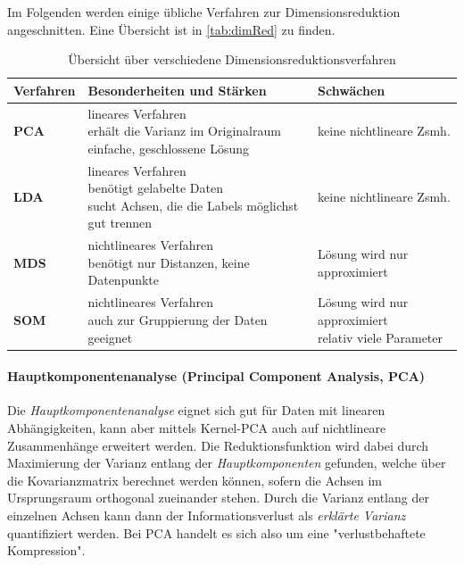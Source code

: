 				Im Folgenden werden einige übliche Verfahren zur Dimensionsreduktion angeschnitten. Eine Übersicht ist in \autoref{tab:dimRed} zu finden.

				\begin{table}
					\centering
					\begin{tabular}{l|ll}
						\toprule
						\textbf{Verfahren} & \textbf{Besonderheiten und Stärken} & \textbf{Schwächen} \\ \midrule
						\textbf{PCA} & \multirowcell{3}[][l]{lineares Verfahren\\erhält die Varianz im Originalraum\\einfache, geschlossene Lösung} & keine nichtlineare Zsmh. \\ \midrule
						\textbf{LDA} & \multirowcell{3}[][l]{lineares Verfahren\\benötigt gelabelte Daten\\sucht Achsen, die die Labels möglichst gut trennen} & keine nichtlineare Zsmh. \\ \midrule
						\textbf{MDS} & \multirowcell{3}[][l]{nichtlineares Verfahren\\benötigt nur Distanzen, keine Datenpunkte} & Lösung wird nur approximiert \\ \midrule
						\textbf{SOM} & \multirowcell{2}[][l]{nichtlineares Verfahren\\auch zur Gruppierung der Daten geeignet} & \multirowcell{2}[][l]{Lösung wird nur approximiert\\relativ viele Parameter} \\
						\bottomrule
					\end{tabular}
					\caption{Übersicht über verschiedene Dimensionsreduktionsverfahren}
					\label{tab:dimRed}
				\end{table}

				\paragraph{Hauptkomponentenanalyse (Principal Component Analysis, PCA)}
					Die \emph{Hauptkomponentenanalyse} eignet sich gut für Daten mit linearen Abhängigkeiten, kann aber mittels Kernel-PCA auch auf nichtlineare Zusammenhänge erweitert werden. Die Reduktionsfunktion wird dabei durch Maximierung der Varianz entlang der \emph{Hauptkomponenten} gefunden, welche über die Kovarianzmatrix berechnet werden können, sofern die Achsen im Ursprungsraum orthogonal zueinander stehen. Durch die Varianz entlang der einzelnen Achsen kann dann der Informationsverlust als \emph{erklärte Varianz} quantifiziert werden. Bei PCA handelt es sich also um eine "verlustbehaftete Kompression".

